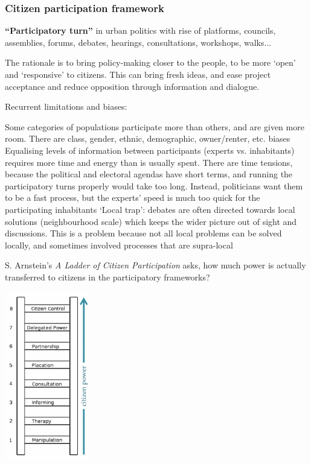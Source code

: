 \documentclass{article}
\begin{document}
\subsubsection{Citizen participation framework}

\textbf{``Participatory turn''} in urban politics with rise of platforms, councils, assemblies, forums, debates, hearings, consultations, workshops, walks...

The rationale is to bring policy-making closer to the people, to be more `open' and `responsive' to citizens. This can bring fresh ideas, and ease project acceptance and reduce opposition through information and dialogue.

Recurrent limitations and biases:
\begin{outline}
	\1 Some categories of populations participate more than others, and are given more room. There are class, gender, ethnic, demographic, owner/renter, etc. biases
	\1 Equalising levels of information between participants (experts vs. inhabitants) requires more time and energy than is usually spent. There are time tensions, because the political and electoral agendas have short terms, and running the participatory turns properly would take too long. Instead, politicians want them to be a fast process, but the experts' speed is much too quick for the participating inhabitants
	\1 `Local trap': debates are often directed towards local solutions (neighbourhood scale) which keeps the wider picture out of sight and discussions. This is a problem because not all local problems can be solved locally, and sometimes involved processes that are supra-local
\end{outline}

S. Arnstein's \textit{A Ladder of Citizen Participation} asks, how much power is actually transferred to citizens in the participatory frameworks?

\begin{center}
\includegraphics[width=10em]{citizen_participation}
\end{center}
\end{document}
